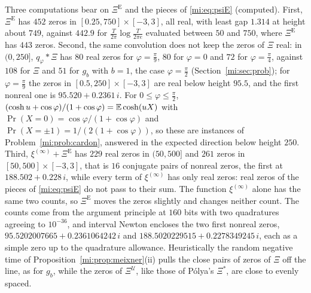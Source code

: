 Three computations bear on $\Xi^{\mathrm E}$ and the pieces of \eqref{mi:eq:psiE} (computed). First, $\Xi^{\mathrm E}$ has $452$ zeros in $[0.25,750]\times[-3,3]$, all real, with least gap $1.314$ at height about $749$, against $442.9$ for $\frac T{2\pi}\log\frac T{2\pi e}$ evaluated between $50$ and $750$, where $\Xi^{\mathrm E}$ has $443$ zeros. Second, the same convolution does not keep the zeros of $\Xi$ real: in $(0,250]$, $q_\varphi*\Xi$ has $80$ real zeros for $\varphi=\frac\pi9$, $80$ for $\varphi=0$ and $72$ for $\varphi=\frac\pi4$, against $108$ for $\Xi$ and $51$ for $g_b$ with $b=1$, the case $\varphi=\frac\pi2$ (Section~\ref{mi:sec:prob}); for $\varphi=\frac\pi9$ the zeros in $[0.5,250]\times[-3,3]$ are real below height $95.5$, and the first nonreal one is $95.520+0.2361\,i$. For $0\le\varphi\le\frac\pi2$, $(\cosh u+\cos\varphi)/(1+\cos\varphi)=\mathbb{E}\cosh(uX)$ with $\Pr(X=0)=\cos\varphi/(1+\cos\varphi)$ and $\Pr(X=\pm1)=1/(2(1+\cos\varphi))$, so these are instances of Problem~\ref{mi:prob:cardon}, answered in the expected direction below height $250$. Third, $\xi^{(\infty)}+\Xi^{\mathrm E}$ has $229$ real zeros in $(50,500]$ and $261$ zeros in $[50,500]\times[-3,3]$, that is $16$ conjugate pairs of nonreal zeros, the first at $188.502+0.228\,i$, while every term of $\xi^{(\infty)}$ has only real zeros: real zeros of the pieces of \eqref{mi:eq:psiE} do not pass to their sum. The function $\xi^{(\infty)}$ alone has the same two counts, so $\Xi^{\mathrm E}$ moves the zeros slightly and changes neither count. The counts come from the argument principle at $160$ bits with two quadratures agreeing to $10^{-36}$, and interval Newton encloses the two first nonreal zeros, $95.5202007665+0.2361064242\,i$ and $188.5020229515+0.2278349245\,i$, each as a simple zero up to the quadrature allowance. Heuristically the random negative time of Proposition~\ref{mi:prop:meixner}(ii) pulls the close pairs of zeros of $\Xi$ off the line, as for $g_b$, while the zeros of $\Xi^{\mathcal U}$, like those of P\'olya's $\Xi^*$, are close to evenly spaced.
